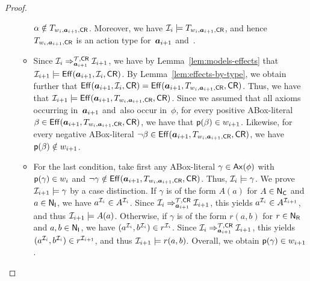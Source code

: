 \begin{proof}
\begin{itemize}
\begin{itemize}
                    $\alpha\notin T_{w_i,\boldsymbol a_{i+1},\mathsf{CR}}$.
                    Moreover, we have $\mathcal{I}_i\models T_{w_i,\boldsymbol a_{i+1},\mathsf{CR}}$,
                    and hence $T_{w_i,\boldsymbol a_{i+1},\mathsf{CR}}$ is an action type
                    for~$\boldsymbol a_{i+1}$ and~\CR.
                \item Since
                    $\mathcal{I}_i\Rightarrow_{\boldsymbol a_{i+1}}^{\mathcal{T},\mathsf{CR}}\mathcal{I}_{i+1}$, we
                    have by Lemma~\ref{lem:models-effects} that
                    $\mathcal{I}_{i+1}\models\operatorname{\mathsf{Eff}}(\boldsymbol a_{i+1},\mathcal{I}_i,\mathsf{CR})$.
                    By Lemma~\ref{lem:effects-by-type}, we obtain further that
                    $\operatorname{\mathsf{Eff}}(\boldsymbol a_{i+1},\mathcal{I}_i,\mathsf{CR})=\operatorname{\mathsf{Eff}}(\boldsymbol a_{i+1},T_{w_i,\boldsymbol a_{i+1},\mathsf{CR}},\mathsf{CR})$.
                    Thus, we have that
                    $\mathcal{I}_{i+1}\models\operatorname{\mathsf{Eff}}(\boldsymbol a_{i+1},T_{w_i,\boldsymbol a_{i+1},\mathsf{CR}},\mathsf{CR})$.
                    Since we assumed that all axioms occurring in~$\boldsymbol a_{i+1}$
                    and~\CR also occur in~$\phi$, for every positive
                    ABox-literal
                    $\beta\in\operatorname{\mathsf{Eff}}(\boldsymbol a_{i+1},T_{w_i,\boldsymbol a_{i+1},\mathsf{CR}},\mathsf{CR})$, we
                    have that $\mathsf{p}(\beta)\in w_{i+1}$.  Likewise, for every
                    negative ABox-literal
                    $\lnot\beta\in\operatorname{\mathsf{Eff}}(\boldsymbol a_{i+1},T_{w_i,\boldsymbol a_{i+1},\mathsf{CR}},\mathsf{CR})$,
                    we have $\mathsf{p}(\beta)\notin w_{i+1}$.
                \item For the last condition, take first any ABox-literal
                    $\gamma\in\operatorname{\mathsf{Ax}}(\phi)$ with $\mathsf{p}(\gamma)\in w_i$ and
                    $\lnot\gamma\notin\operatorname{\mathsf{Eff}}(\boldsymbol a_{i+1},T_{w_i,\boldsymbol a_{i+1},\mathsf{CR}},\mathsf{CR})$.
                    Thus, $\mathcal{I}_i\models\gamma$.  We prove
                    $\mathcal{I}_{i+1}\models\gamma$ by a case distinction.  If
                    $\gamma$ is of the form $A(a)$ for $A\in\mathsf{N_C}$ and $a\in\mathsf{N_I}$,
                    we have $a^{\mathcal{I}_i}\in A^{\mathcal{I}_i}$.  Since
                    $\mathcal{I}_i\Rightarrow_{\boldsymbol a_{i+1}}^{\mathcal{T},\mathsf{CR}}\mathcal{I}_{i+1}$, this
                    yields $a^{\mathcal{I}_i}\in A^{\mathcal{I}_{i+1}}$, and thus
                    $\mathcal{I}_{i+1}\models A(a)$.  Otherwise, if $\gamma$ is of the
                    form $r(a,b)$ for $r\in\mathsf{N_R}$ and $a,b\in\mathsf{N_I}$, we have
                    $(a^{\mathcal{I}_i},b^{\mathcal{I}_i})\in r^{\mathcal{I}_i}$.  Since
                    $\mathcal{I}_i\Rightarrow_{\boldsymbol a_{i+1}}^{\mathcal{T},\mathsf{CR}}\mathcal{I}_{i+1}$, this
                    yields $(a^{\mathcal{I}_i},b^{\mathcal{I}_i})\in r^{\mathcal{I}_{i+1}}$, and thus
                    $\mathcal{I}_{i+1}\models r(a,b)$.
                    Overall, we obtain $\mathsf{p}(\gamma)\in w_{i+1}$.


\end{itemize}
\end{itemize}
\end{proof}
